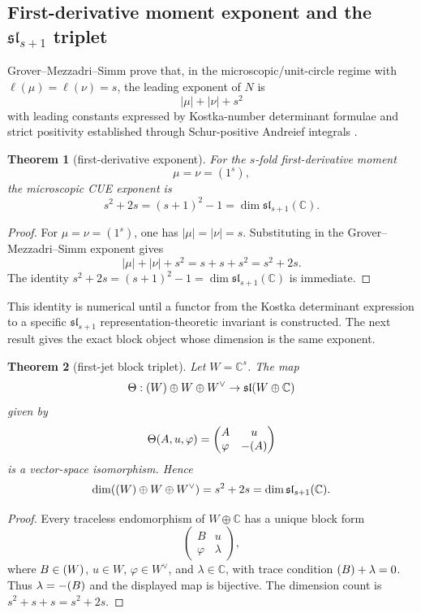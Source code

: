 \documentclass[11pt]{article}
\newtheorem{theorem}{Theorem}[section]
\let\Tr\relax
\let\End\relax
\DeclareMathOperator{\Tr}{Tr}
\DeclareMathOperator{\End}{End}
\newcommand{\C}{\mathbb C}
\begin{document}
\subsection{First-derivative moment exponent and the $\mathfrak{sl}_{s+1}$ triplet}

Grover--Mezzadri--Simm prove that, in the microscopic/unit-circle regime with
$\ell(\mu)=\ell(\nu)=s$, the leading exponent of $N$ is
\[
|\mu|+|\nu|+s^2
\]
with leading constants expressed by Kostka-number determinant formulae and strict
positivity established through Schur-positive Andreief integrals \cite{GMS}.

\begin{theorem}[first-derivative exponent]
For the $s$-fold first-derivative moment
\[
\mu=\nu=(1^s),
\]
the microscopic CUE exponent is
\[
s^2+2s=(s+1)^2-1=\dim\mathfrak{sl}_{s+1}(\C).
\]
\end{theorem}

\begin{proof}
For $\mu=\nu=(1^s)$, one has $|\mu|=|\nu|=s$.  Substituting in the
Grover--Mezzadri--Simm exponent gives
\[
|\mu|+|\nu|+s^2=s+s+s^2=s^2+2s.
\]
The identity $s^2+2s=(s+1)^2-1=\dim\mathfrak{sl}_{s+1}(\C)$ is immediate.
\end{proof}

This identity is numerical until a functor from the Kostka determinant expression to a
specific $\mathfrak{sl}_{s+1}$ representation-theoretic invariant is constructed.  The next
result gives the exact block object whose dimension is the same exponent.

\begin{theorem}[first-jet block triplet]
Let $W=\C^s$.  The map
\[
\Theta:\End(W)\oplus W\oplus W^\vee\to\mathfrak{sl}(W\oplus\C)
\]
given by
\[
\Theta(A,u,\varphi)=
\begin{pmatrix}
A & u\\
\varphi & -\Tr(A)
\end{pmatrix}
\]
is a vector-space isomorphism.  Hence
\[
\dim(\End(W)\oplus W\oplus W^\vee)=s^2+2s=\dim\mathfrak{sl}_{s+1}(\C).
\]
\end{theorem}

\begin{proof}
Every traceless endomorphism of $W\oplus\C$ has a unique block form
\[
\begin{pmatrix}
B & u\\
\varphi & \lambda
\end{pmatrix},
\]
where $B\in\End(W)$, $u\in W$, $\varphi\in W^\vee$, and $\lambda\in\C$, with trace
condition $\Tr(B)+\lambda=0$.  Thus $\lambda=-\Tr(B)$ and the displayed map is
bijective.  The dimension count is $s^2+s+s=s^2+2s$.
\end{proof}
\end{document}
